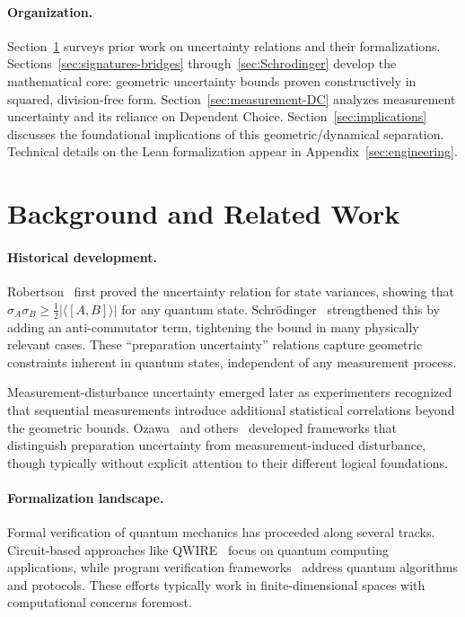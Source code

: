 \documentclass[11pt]{article}
\theoremstyle{plain}
\theoremstyle{definition}
\theoremstyle{remark}
\begin{document}
\paragraph{Organization.}
Section~\ref{sec:related} surveys prior work on uncertainty relations and their formalizations.
Sections~\ref{sec:signatures-bridges} through~\ref{sec:Schrodinger} develop the mathematical core: geometric uncertainty bounds proven constructively in squared, division-free form.
Section~\ref{sec:measurement-DC} analyzes measurement uncertainty and its reliance on Dependent Choice.
Section~\ref{sec:implications} discusses the foundational implications of this geometric/dynamical separation.
Technical details on the Lean formalization appear in Appendix~\ref{sec:engineering}.

\section{Background and Related Work}
\label{sec:related}

\paragraph{Historical development.}
Robertson~\cite{Robertson1929} first proved the uncertainty relation for state variances, showing that $\sigma_A \sigma_B \geq \frac{1}{2}|\langle[A,B]\rangle|$ for any quantum state. Schrödinger~\cite{Schrodinger1930} strengthened this by adding an anti-commutator term, tightening the bound in many physically relevant cases. These ``preparation uncertainty'' relations capture geometric constraints inherent in quantum states, independent of any measurement process.

Measurement-disturbance uncertainty emerged later as experimenters recognized that sequential measurements introduce additional statistical correlations beyond the geometric bounds. Ozawa~\cite{Ozawa2003} and others~\cite{BuschLahtiWerner2014} developed frameworks that distinguish preparation uncertainty from measurement-induced disturbance, though typically without explicit attention to their different logical foundations.

\paragraph{Formalization landscape.}
Formal verification of quantum mechanics has proceeded along several tracks. Circuit-based approaches like QWIRE~\cite{QWIRE2017} focus on quantum computing applications, while program verification frameworks~\cite{Ying2016} address quantum algorithms and protocols. These efforts typically work in finite-dimensional spaces with computational concerns foremost.
\end{document}
